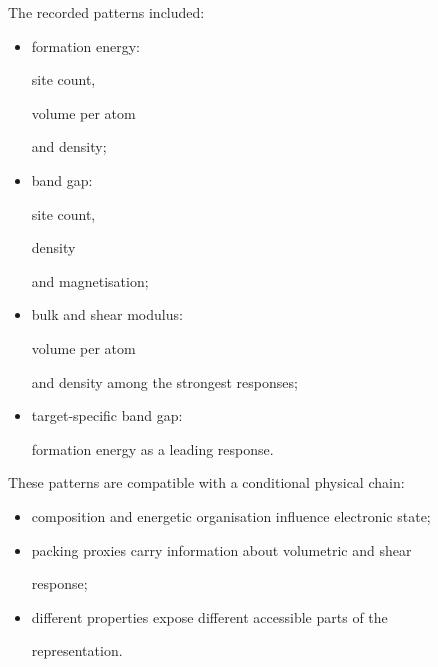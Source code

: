 \documentclass[11pt,a4paper,oneside]{report}
\begin{document}
The recorded patterns included:



\begin{itemize}



\item

formation energy:

site count,

volume per atom

and density;



\item

band gap:

site count,

density

and magnetisation;



\item

bulk and shear modulus:

volume per atom

and density among the strongest responses;



\item

target-specific band gap:

formation energy as a leading response.



\end{itemize}



These patterns are compatible with a conditional physical chain:



\begin{itemize}



\item

composition and energetic organisation influence electronic state;



\item

packing proxies carry information about volumetric and shear

response;



\item

different properties expose different accessible parts of the

representation.



\end{itemize}
\end{document}
